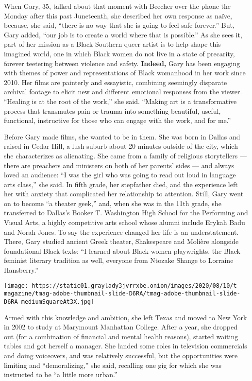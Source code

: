 When Gary, 35, talked about that moment with Beecher over the phone the
Monday after this past Juneteenth, she described her own response as
naïve, because, she said, ``there is no way that she is going to feel
safe forever.'' But, Gary added, ``our job is to create a world where
that is possible.'' As she sees it, part of her mission as a Black
Southern queer artist is to help shape this imagined world, one in which
Black women do not live in a state of precarity, forever teetering
between violence and safety. \textbf{Indeed,} Gary has been engaging
with themes of power and representations of Black womanhood in her work
since 2010. Her films are painterly and essayistic, combining seemingly
disparate archival footage to elicit new and different emotional
responses from the viewer. ``Healing is at the root of the work,'' she
said. ``Making art is a transformative process that transmutes pain or
trauma into something beautiful, useful, functional, instructive for
those who can engage with the work, and for me.''

Before Gary made films, she wanted to be in them. She was born in Dallas
and raised in Cedar Hill, a lush suburb about 20 minutes outside of the
city, which she characterizes as alienating. She came from a family of
religious storytellers --- there are preachers and ministers on both of
her parents' sides --- and always loved an audience: ``I was the girl
who was going to read out loud in language arts class,'' she said. In
fifth grade, her stepfather died, and the experience left her with
anxiety that complicated her relationship to attention. Still, Gary went
on to become ``a theater geek,'' and, when she was in the 11th grade,
she transferred to Dallas's Booker T. Washington High School for the
Performing and Visual Arts, a highly competitive arts school whose
alumni include Erykah Badu and Norah Jones. To say the experience
changed her life is an understatement. There, Gary studied ancient Greek
theater, Shakespeare and Molière alongside foundational Black texts: ``I
learned about Black women playwrights, the Black feminist literary
tradition as well, everyone from Ntozake Shange to Lorraine Hansberry.''

\texttt{[image: https://static01.graylady3jvrrxbe.onion/images/2020/08/10/t-magazine/tmag-adobe-thumbnail-slide-D6RA/tmag-adobe-thumbnail-slide-D6RA-mediumSquareAt3X.jpg]}

Armed with this knowledge and ambition, she left Texas and moved to New
York in 2002 to study at Marymount Manhattan College. After a year, she
dropped out (for a combination of financial and mental health reasons),
started waiting tables and got herself a manager. She landed some roles
in television commercials and doing voiceovers, and was relatively
successful, but the opportunities were limiting and ``demoralizing,''
she said, recalling one gig for which she was instructed to be ``a
little more urban.''

